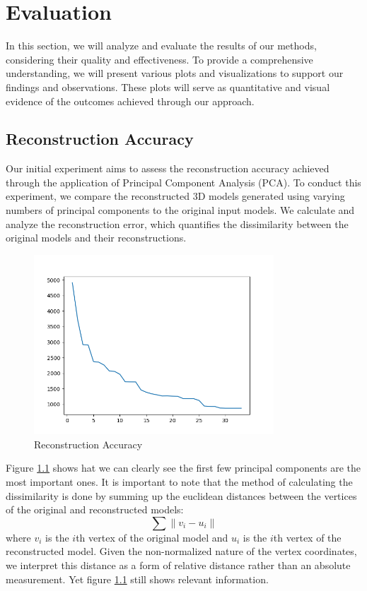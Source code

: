 \chapter{Evaluation}\label{ch04_evaluation}

In this section, we will analyze and evaluate the results of our methods, considering their quality and effectiveness. To provide a comprehensive understanding, 
we will present various plots and visualizations to support our findings and observations. These plots will serve as quantitative and visual evidence of the outcomes achieved through our approach. 

\section{Reconstruction Accuracy}

Our initial experiment aims to assess the reconstruction accuracy achieved through the application of Principal Component Analysis (PCA). 
To conduct this experiment, we compare the reconstructed 3D models generated using varying numbers of principal components to the original input models. 
We calculate and analyze the reconstruction error, which quantifies the dissimilarity between the original models and their reconstructions.

\begin{figure}[H]
    \centering
    \includegraphics[width = 0.8\textwidth]{figures/plot_recreation_accuracy.png}
    \caption{Reconstruction Accuracy}
    \label{fig:reconstruction_accuracy}
\end{figure}

Figure \ref{fig:reconstruction_accuracy} shows hat we can clearly see the first few principal components are the most important ones. It is important to note that the method of calculating the dissimilarity is done by summing up
the euclidean distances between the vertices of the original and reconstructed models:
\[\sum \lVert v_i - u_i \rVert\]
where $v_i$ is the $i$th vertex of the original model and $u_i$ is the $i$th vertex of the reconstructed model. Given the non-normalized nature of the vertex coordinates, 
we interpret this distance as a form of relative distance rather than an absolute measurement. Yet figure \ref{fig:reconstruction_accuracy} still shows relevant information.


